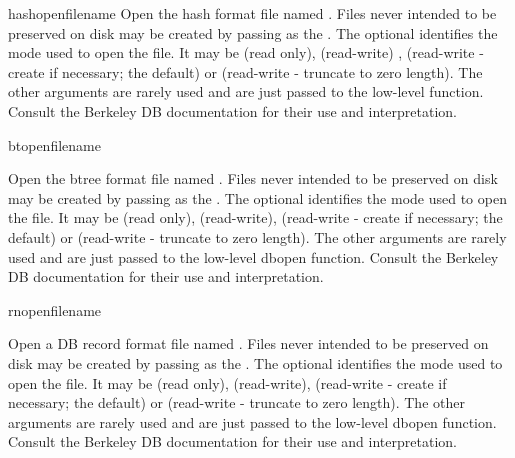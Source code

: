 \begin{funcdesc}{hashopen}{filename}
Open the hash format file named .  Files never intended
to be preserved on disk may be created by passing  as the 
.  The optional
 identifies the mode used to open the file.  It may be
 (read only),  (read-write) ,
 (read-write - create if necessary; the default) or
 (read-write - truncate to zero length).  The other
arguments are rarely used and are just passed to the low-level
 function.  Consult the Berkeley DB documentation
for their use and interpretation.
\end{funcdesc}

\begin{funcdesc}{btopen}{filename}

Open the btree format file named .  Files never intended 
to be preserved on disk may be created by passing  as the 
.  The optional
 identifies the mode used to open the file.  It may be
 (read only),  (read-write),
 (read-write - create if necessary; the default) or
 (read-write - truncate to zero length).  The other
arguments are rarely used and are just passed to the low-level dbopen
function.  Consult the Berkeley DB documentation for their use and
interpretation.
\end{funcdesc}

\begin{funcdesc}{rnopen}{filename}

Open a DB record format file named .  Files never intended 
to be preserved on disk may be created by passing  as the 
.  The optional
 identifies the mode used to open the file.  It may be
 (read only),  (read-write),
 (read-write - create if necessary; the default) or
 (read-write - truncate to zero length).  The other
arguments are rarely used and are just passed to the low-level dbopen
function.  Consult the Berkeley DB documentation for their use and
interpretation.
\end{funcdesc}


